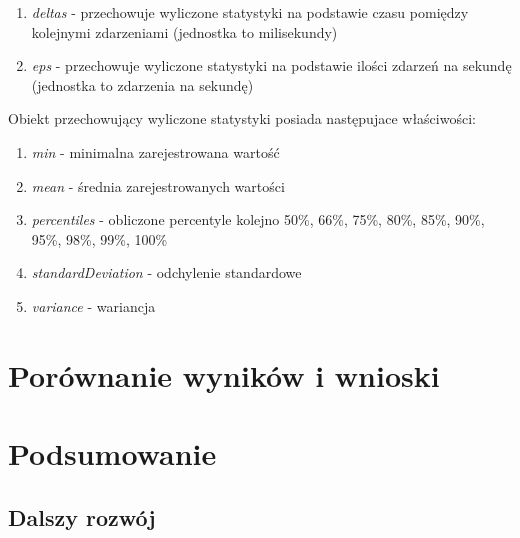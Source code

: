 \documentclass[polish, twoside, 12pt]{mwart}
\let\stdsection\section
\renewcommand*{\section}{\clearpage\stdsection}
\begin{document}
\begin{enumerate}
  \item \emph{deltas} - przechowuje wyliczone statystyki na podstawie czasu pomiędzy kolejnymi zdarzeniami (jednostka to milisekundy)
  \item \emph{eps} - przechowuje wyliczone statystyki na podstawie ilości zdarzeń na sekundę (jednostka to zdarzenia na sekundę)
\end{enumerate}

Obiekt przechowujący wyliczone statystyki posiada następujace właściwości:

\begin{enumerate}
  \item \emph{min} - minimalna zarejestrowana wartość
  \item \emph{mean} - średnia zarejestrowanych wartości
  \item \emph{percentiles} - obliczone percentyle kolejno 50\%, 66\%, 75\%, 80\%, 85\%, 90\%, 95\%, 98\%, 99\%, 100\%
  \item \emph{standardDeviation} - odchylenie standardowe
  \item \emph{variance} - wariancja
\end{enumerate}

\section{Porównanie wyników i wnioski}

\section{Podsumowanie}

\subsection{Dalszy rozwój}
\end{document}
